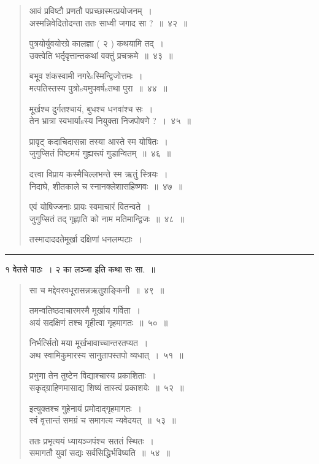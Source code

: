 \documentclass[11pt, openany]{book}
\begin{document}
\begin{multicols}{2}
\begin{quote}
{आवं प्रविष्टौ प्रणतौ पप्रच्छास्मत्प्रयोजनम्~।\\
अस्मन्निवेदितोदन्ता ततः साध्वी जगाद सा ?~॥~४२~॥

पुत्रयोर्युवयोरग्रे कालज्ञा ( २ ) कथयामि तद्~।\\
उक्त्वेति भर्तृवृत्तान्तकथां वक्तुं प्रचक्रमे~॥~४३~॥

बभूव शंकस्वामी नगरेsस्मिन्द्विजोत्तमः~।\\
मत्पतिस्तस्य पुत्रोsयमुपवर्षsतथा पुरा~॥~४४~॥

मूर्खश्च दुर्गतश्चायं, बुधश्च धनवांश्च सः~।\\
तेन भ्रात्रा स्वभार्याsस्य नियुक्ता निजपोषणे ?~।~४५~॥

प्रावृट् कदाचिदासन्ना तस्या आस्ते स्म योषितः~।\\
जुगुप्सितं पिष्टमयं गुह्यरूपं गुडान्वितम्~॥~४६~॥

दत्त्वा विप्राय कस्मैचिल्लभन्ते स्म ऋतुं स्त्रियः~।\\
निदाघे, शीतकाले च स्नानक्लेशासहिष्णवः~॥~४७~॥

एवं योषिज्जनाः प्रायः स्वमाचारं वितन्वते~।\\
जुगुप्सितं तद् गृह्णाति को नाम मतिमान्द्विजः~॥~४८~॥

तस्मादाददतेमूर्खा दक्षिणां धनलम्पटाः~।}
\end{quote}

\rule{0.9\linewidth}{0.5pt}

१ वेतसे पाठः~। २ {\qt का लञ्जा} इति कथा सः सा.~॥ 

\columnbreak

\begin{quote}
{\mbh सा च मद्देवरवधूरासन्नऋतुशङ्किनी~॥~४९~॥

तमन्वतिष्ठदाचारमस्मै मूर्खाय गर्विता~।\\
अयं सदक्षिणं तश्च गृहीत्वा गृहमागतः~॥~५०~॥

निर्भर्त्सितो मया मूर्खभावाच्चान्तरतप्यत~।\\
अथ स्वामिकुमारस्य सानुतापस्तपो व्यधात्~।~५१~॥

प्रभुणा तेन तुष्टेन विद्याश्चास्य प्रकाशिताः~।\\
सकृद्ग्राहिणमासाद्य शिष्यं तास्त्वं प्रकाशयेः~॥~५२~॥

इत्युक्तश्च गुहेनायं प्रमोदाद्गृहमागतः~।\\
स्वं वृत्तान्तं समग्रं च समागत्य न्यवेदयत्~॥~५३~॥

ततः प्रभृत्ययं ध्यायञ्जपंश्च सततं स्थितः~।\\
समागतौ युवां सद्यः सर्वसिद्धिर्भविष्यति~॥~५४~॥

}
\end{quote}
\end{multicols}
\end{document}
